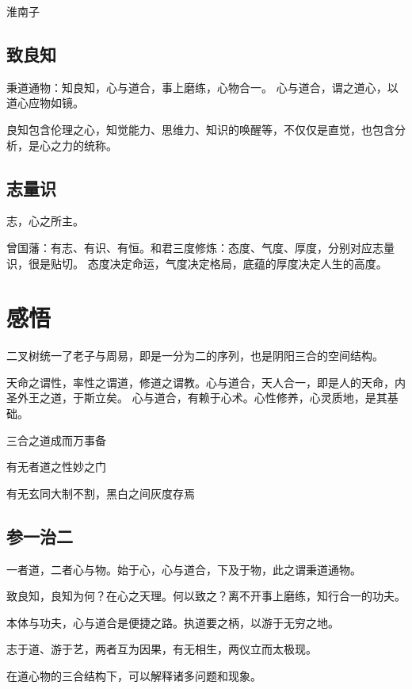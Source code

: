 淮南子

\subsection{致良知}

秉道通物：知良知，心与道合，事上磨练，心物合一。
心与道合，谓之道心，以道心应物如镜。

良知包含伦理之心，知觉能力、思维力、知识的唤醒等，不仅仅是直觉，也包含分析，是心之力的统称。

\subsection{志量识}

志，心之所主。

曾国藩：有志、有识、有恒。和君三度修炼：态度、气度、厚度，分别对应志量识，很是贴切。
态度决定命运，气度决定格局，底蕴的厚度决定人生的高度。

\section{感悟}

二叉树统一了老子与周易，即是一分为二的序列，也是阴阳三合的空间结构。

天命之谓性，率性之谓道，修道之谓教。心与道合，天人合一，即是人的天命，内圣外王之道，于斯立矣。
心与道合，有赖于心术。心性修养，心灵质地，是其基础。

三合之道成而万事备

有无者道之性妙之门

有无玄同大制不割，黑白之间灰度存焉

\subsection{参一治二}

一者道，二者心与物。始于心，心与道合，下及于物，此之谓秉道通物。

致良知，良知为何？在心之天理。何以致之？离不开事上磨练，知行合一的功夫。

本体与功夫，心与道合是便捷之路。执道要之柄，以游于无穷之地。

志于道、游于艺，两者互为因果，有无相生，两仪立而太极现。

在道心物的三合结构下，可以解释诸多问题和现象。

